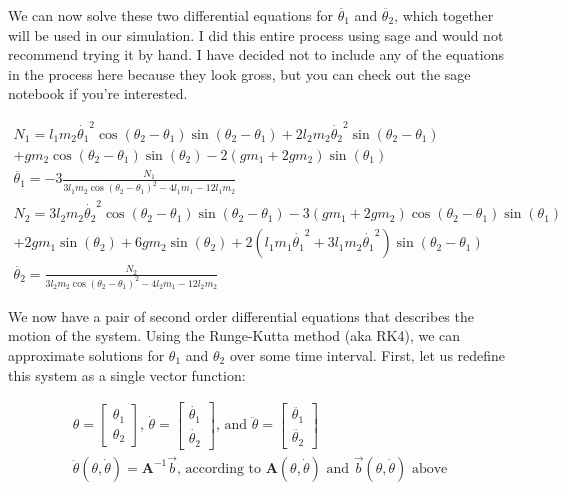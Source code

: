 \documentclass[]{article}
\begin{document}
We can now solve these two differential equations for $\ddot{\theta_1}$ and $\ddot{\theta_2}$, which together will be used in our simulation. I did this entire process using sage and would not recommend trying it by hand. I have decided not to include any of the equations in the process here because they look gross, but you can check out the sage notebook if you're interested.

\begin{gather*}
	N_1 = l_1 m_2 {\dot{\theta_1}}^{2} \cos({\theta_2} - {\theta_1}) \sin({\theta_2} - {\theta_1}) + 2  l_2 m_2 {\dot{\theta_2}}^{2} \sin({\theta_2} - {\theta_1}) \\ + g m_2 \cos({\theta_2} - {\theta_1}) \sin({\theta_2}) - 2  {(g m_1 + 2  g m_2)} \sin({\theta_1}) \\
	\ddot{\theta_1} = -3\frac{N_1}{3  l_1 m_2 \cos({\theta_2} - {\theta_1})^{2} - 4  l_1 m_1 - 12  l_1 m_2} \\
	N_2 = 3  l_2 m_2 {\dot{\theta_2}}^{2} \cos({\theta_2} - {\theta_1}) \sin({\theta_2} - {\theta_1}) - 3  {(g m_1 + 2  g m_2)} \cos({\theta_2} - {\theta_1}) \sin({\theta_1}) \\ + 2  g m_1 \sin({\theta_2}) + 6  g m_2 \sin({\theta_2}) + 2  {(l_1 m_1 {\dot{\theta_1}}^{2} + 3  l_1 m_2 {\dot{\theta_1}}^{2})} \sin({\theta_2} - {\theta_1}) \\
	\ddot{\theta_2} = \frac{N_2}{3  l_2 m_2 \cos({\theta_2} - {\theta_1})^{2} - 4  l_2 m_1 - 12  l_2 m_2}
\end{gather*}

We now have a pair of second order differential equations that describes the motion of the system. Using the Runge-Kutta method (aka RK4), we can approximate solutions for $\theta_1$ and $\theta_2$ over some time interval. First, let us redefine this system as a single vector function:

\begin{gather*}
	\theta = 
	\begin{bmatrix}
		\theta_1 \\
		\theta_2
	\end{bmatrix} \text{, }
	\dot{\theta} = 
	\begin{bmatrix}
		\dot{\theta_1} \\
		\dot{\theta_2}
	\end{bmatrix} \text{, and }
	\ddot{\theta} =
	\begin{bmatrix}
		\ddot{\theta_1} \\
		\ddot{\theta_2}
	\end{bmatrix} \\
	\ddot{\theta}(\theta, \dot{\theta}) = \boldsymbol{A}^{-1}\vec{b}\text{, according to $\boldsymbol{A}(\theta, \dot{\theta})$ and $\vec{b}(\theta, \dot{\theta})$ above}
\end{gather*}
\end{document}
